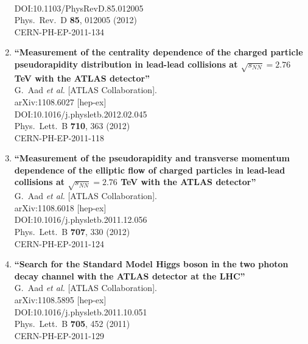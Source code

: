 \documentclass{article}
\begin{document}
\begin{enumerate}
  \\{}DOI:10.1103/PhysRevD.85.012005
  \\{}Phys.\ Rev.\ D {\bf 85}, 012005 (2012)
  \\{}CERN-PH-EP-2011-134
\item%
{\bf ``Measurement of the centrality dependence of the charged particle pseudorapidity distribution in lead-lead collisions at $\sqrt{s_{NN}}=2.76$ TeV with the ATLAS detector''}
  \\{}G.~Aad {\it et al.} [ATLAS Collaboration].
  \\{}arXiv:1108.6027 [hep-ex]
  \\{}DOI:10.1016/j.physletb.2012.02.045
  \\{}Phys.\ Lett.\ B {\bf 710}, 363 (2012)
  \\{}CERN-PH-EP-2011-118
\item%
{\bf ``Measurement of the pseudorapidity and transverse momentum dependence of the elliptic flow of charged particles in lead-lead collisions at $\sqrt{s_{NN}}=2.76$ TeV with the ATLAS detector''}
  \\{}G.~Aad {\it et al.} [ATLAS Collaboration].
  \\{}arXiv:1108.6018 [hep-ex]
  \\{}DOI:10.1016/j.physletb.2011.12.056
  \\{}Phys.\ Lett.\ B {\bf 707}, 330 (2012)
  \\{}CERN-PH-EP-2011-124
\item%
{\bf ``Search for the Standard Model Higgs boson in the two photon decay channel with the ATLAS detector at the LHC''}
  \\{}G.~Aad {\it et al.} [ATLAS Collaboration].
  \\{}arXiv:1108.5895 [hep-ex]
  \\{}DOI:10.1016/j.physletb.2011.10.051
  \\{}Phys.\ Lett.\ B {\bf 705}, 452 (2011)
  \\{}CERN-PH-EP-2011-129

\end{enumerate}
\end{document}
